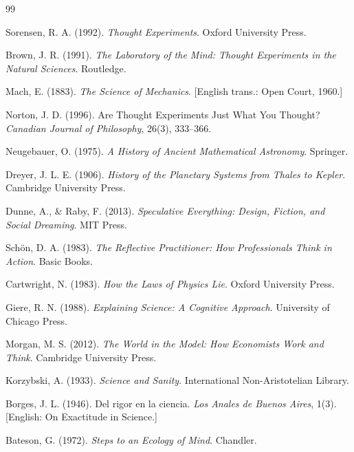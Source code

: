 \documentclass[12pt, a4paper]{article}
\theoremstyle{named}
\begin{document}
\begin{thebibliography}{99}

Sorensen, R. A. (1992).
\textit{Thought Experiments}.
Oxford University Press.

Brown, J. R. (1991).
\textit{The Laboratory of the Mind: Thought Experiments in the Natural Sciences}.
Routledge.

Mach, E. (1883).
\textit{The Science of Mechanics}.
[English trans.: Open Court, 1960.]

Norton, J. D. (1996).
Are Thought Experiments Just What You Thought?
\textit{Canadian Journal of Philosophy}, 26(3), 333--366.

Neugebauer, O. (1975).
\textit{A History of Ancient Mathematical Astronomy}.
Springer.

Dreyer, J. L. E. (1906).
\textit{History of the Planetary Systems from Thales to Kepler}.
Cambridge University Press.

Dunne, A., \& Raby, F. (2013).
\textit{Speculative Everything: Design, Fiction, and Social Dreaming}.
MIT Press.

Sch\"{o}n, D. A. (1983).
\textit{The Reflective Practitioner: How Professionals Think in Action}.
Basic Books.

Cartwright, N. (1983).
\textit{How the Laws of Physics Lie}.
Oxford University Press.

Giere, R. N. (1988).
\textit{Explaining Science: A Cognitive Approach}.
University of Chicago Press.

Morgan, M. S. (2012).
\textit{The World in the Model: How Economists Work and Think}.
Cambridge University Press.

Korzybski, A. (1933).
\textit{Science and Sanity}.
International Non-Aristotelian Library.

Borges, J. L. (1946).
Del rigor en la ciencia.
\textit{Los Anales de Buenos Aires}, 1(3).
[English: On Exactitude in Science.]

Bateson, G. (1972).
\textit{Steps to an Ecology of Mind}.
Chandler.


\end{thebibliography}
\end{document}
